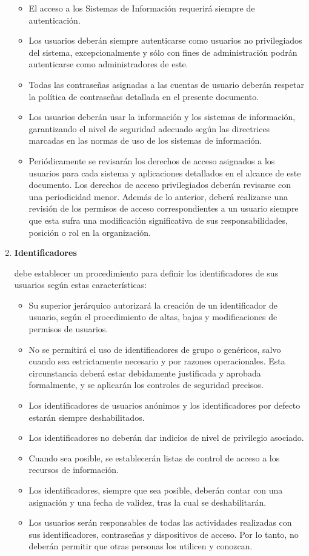 \begin{enumerate}[label=\alph*)]
\begin{itemize}
      \item El acceso a los Sistemas de Información requerirá siempre de autenticación.
      \item Los usuarios deberán siempre autenticarse como usuarios no privilegiados del sistema, excepcionalmente y sólo con fines de administración podrán autenticarse como administradores de este.
      \item Todas las contraseñas asignadas a las cuentas de usuario deberán respetar la política de contraseñas detallada en el presente documento.
      \item Los usuarios deberán usar la información y los sistemas de información, garantizando el nivel de seguridad adecuado según las directrices marcadas en las normas de uso de los sistemas de información.
      \item Periódicamente se revisarán los derechos de acceso asignados a los usuarios para cada sistema y aplicaciones detallados en el alcance de este documento. Los derechos de acceso privilegiados deberán revisarse con una periodicidad menor. Además de lo anterior, deberá realizarse una revisión de los permisos de acceso correspondientes a un usuario siempre que esta sufra una modificación significativa de sus responsabilidades, posición o rol en la organización.
    \end{itemize}

    \item \textbf{Identificadores}

    \Beneficiario{} debe establecer un procedimiento para definir los identificadores de sus usuarios según estas características:

    \begin{itemize}
      \item Su superior jerárquico autorizará la creación de un identificador de usuario, según el procedimiento de altas, bajas y modificaciones de permisos de usuarios.
      \item No se permitirá el uso de identificadores de grupo o genéricos, salvo cuando sea estrictamente necesario y por razones operacionales. Esta circunstancia deberá estar debidamente justificada y aprobada formalmente, y se aplicarán los controles de seguridad precisos.
      \item Los identificadores de usuarios anónimos y los identificadores por defecto estarán siempre deshabilitados.
      \item Los identificadores no deberán dar indicios de nivel de privilegio asociado.
      \item Cuando sea posible, se establecerán listas de control de acceso a los recursos de información.
      \item Los identificadores, siempre que sea posible, deberán contar con una asignación y una fecha de validez, tras la cual se deshabilitarán.
      \item Los usuarios serán responsables de todas las actividades realizadas con sus identificadores, contraseñas y dispositivos de acceso. Por lo tanto, no deberán permitir que otras personas los utilicen y conozcan.
    \end{itemize}


\end{enumerate}
